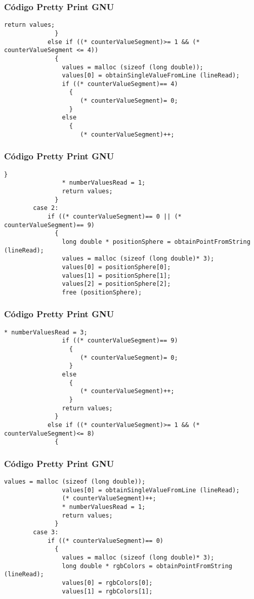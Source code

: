 \documentclass{beamer}
\begin{document}
\begin{frame}[fragile]
\frametitle{C\'odigo Pretty Print GNU}
\begin{lstlisting}[style=CStyle]
                return values;
              }
            else if ((* counterValueSegment)>= 1 && (* counterValueSegment <= 4))
              {
                values = malloc (sizeof (long double));
                values[0] = obtainSingleValueFromLine (lineRead);
                if ((* counterValueSegment)== 4)
                  {
                     (* counterValueSegment)= 0;
                  }
                else
                  {
                     (* counterValueSegment)++;
\end{lstlisting}
\end{frame}
\begin{frame}[fragile]
\frametitle{C\'odigo Pretty Print GNU}
\begin{lstlisting}[style=CStyle]
                  }
                * numberValuesRead = 1;
                return values;
              }
        case 2:
            if ((* counterValueSegment)== 0 || (* counterValueSegment)== 9)
              {
                long double * positionSphere = obtainPointFromString (lineRead);
                values = malloc (sizeof (long double)* 3);
                values[0] = positionSphere[0];
                values[1] = positionSphere[1];
                values[2] = positionSphere[2];
                free (positionSphere);
\end{lstlisting}
\end{frame}
\begin{frame}[fragile]
\frametitle{C\'odigo Pretty Print GNU}
\begin{lstlisting}[style=CStyle]
                * numberValuesRead = 3;
                if ((* counterValueSegment)== 9)
                  {
                     (* counterValueSegment)= 0;
                  }
                else
                  {
                     (* counterValueSegment)++;
                  }
                return values;
              }
            else if ((* counterValueSegment)>= 1 && (* counterValueSegment)<= 8)
              {
                \end{lstlisting}
\end{frame}
\begin{frame}[fragile]
\frametitle{C\'odigo Pretty Print GNU}
\begin{lstlisting}[style=CStyle]
                values = malloc (sizeof (long double));
                values[0] = obtainSingleValueFromLine (lineRead);
                (* counterValueSegment)++;
                * numberValuesRead = 1;
                return values;
              }
        case 3:
            if ((* counterValueSegment)== 0)
              {
                values = malloc (sizeof (long double)* 3);
                long double * rgbColors = obtainPointFromString (lineRead);
                values[0] = rgbColors[0];
                values[1] = rgbColors[1];
\end{lstlisting}
\end{frame}
\end{document}
